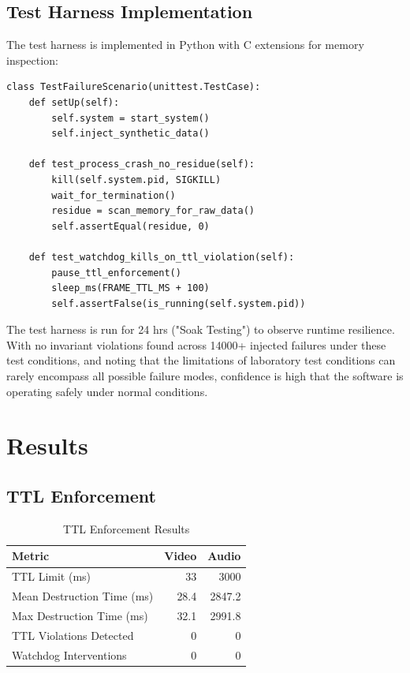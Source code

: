 \documentclass[conference]{IEEEtran}
\begin{document}
\subsection{Test Harness Implementation}
The test harness is implemented in Python with C extensions for memory inspection:

\begin{lstlisting}[caption={Fault Injection Test Structure}]
class TestFailureScenario(unittest.TestCase):
    def setUp(self):
        self.system = start_system()
        self.inject_synthetic_data()
    
    def test_process_crash_no_residue(self):
        kill(self.system.pid, SIGKILL)
        wait_for_termination()
        residue = scan_memory_for_raw_data()
        self.assertEqual(residue, 0)
    
    def test_watchdog_kills_on_ttl_violation(self):
        pause_ttl_enforcement()
        sleep_ms(FRAME_TTL_MS + 100)
        self.assertFalse(is_running(self.system.pid))
\end{lstlisting}

The test harness is run for 24 hrs ("Soak Testing") to observe runtime resilience. With no invariant violations found across 14000+ injected failures under these test conditions, and noting that the limitations of laboratory test conditions can rarely encompass all possible failure modes, confidence is high that the software is operating safely under normal conditions.

\section{Results}

\subsection{TTL Enforcement}

\begin{table}[h]
\caption{TTL Enforcement Results}
\centering
\begin{tabular}{l r r}
\toprule
\textbf{Metric} & \textbf{Video} & \textbf{Audio} \\
\midrule
TTL Limit (ms) & 33 & 3000 \\
Mean Destruction Time (ms) & 28.4 & 2847.2 \\
Max Destruction Time (ms) & 32.1 & 2991.8 \\
TTL Violations Detected & 0 & 0 \\
Watchdog Interventions & 0 & 0 \\
\bottomrule
\end{tabular}
\label{tab:ttl}
\end{table}
\end{document}
